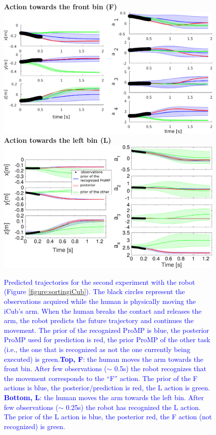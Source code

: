 \documentclass[utf8]{frontiersSCNS} %
\newcommand{\rev}[1]{\textcolor{blue}{#1}}
\begin{document}
\begin{figure}[ht]
\centering
\textbf{Action towards the front bin (F)}\\
\includegraphics[width=0.8\hsize]{img/FRONT2modif.pdf}\\
\textbf{Action towards the left bin (L)}\\
\includegraphics[width=0.8\hsize]{img/FigLeft.pdf}
\caption{\rev{Predicted trajectories for the second experiment with the robot (Figure \ref{figure:sortingiCub}). The black circles represent the observations acquired while the human is physically moving the iCub's arm. When the human breaks the contact and releases the arm, the robot predicts the future trajectory and continues the movement.  The prior of the recognized ProMP is blue, the posterior ProMP used for prediction is red, the prior ProMP of the other task (i.e., the one that is recognized as not the one currently being executed) is green.\textbf{Top, F}: the human moves the arm towards the front bin. After few observations ($\sim$ 0.5s) the robot recognizes that the movement corresponds to the ``F'' action. The prior of the F actions is blue, the posterior/prediction is red, the L action is green. \textbf{Bottom, L}: the human moves the arm towards the left bin.  After few observations ($\sim$ 0.25s) the robot has recognized the L action. The prior of the L action is blue, the posterior red, the F action (not recognized) is green.}}
\label{figure:sortingiCubTrajectories}
\end{figure}
\end{document}
